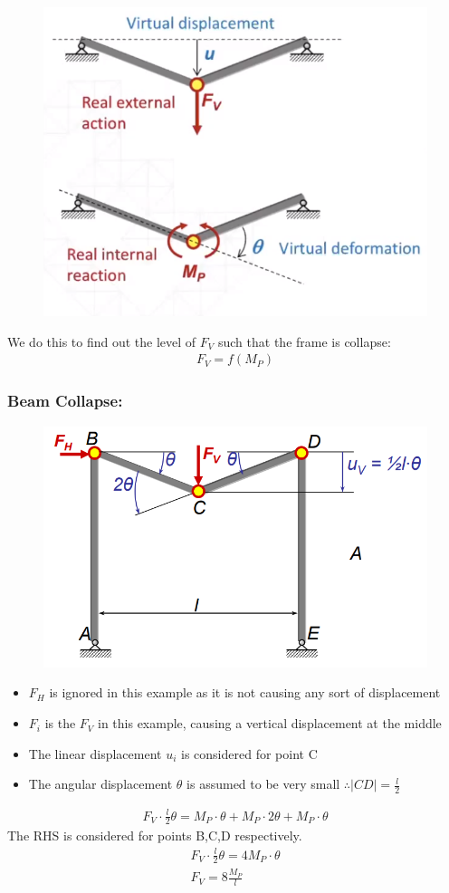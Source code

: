 \documentclass[class=report, crop=false, 12pt,a4paper]{standalone}
\begin{document}
\begin{figure}[H]
  \centering
  \includegraphics[width = 0.6 \textwidth]{../img/beam41.PNG}
\end{figure}
We do this to find out the level of $F_V$ such that the frame is collapse:
\begin{gather}
  F_V = f(M_P)
\end{gather}
\subsubsection{Beam Collapse:}
\begin{figure}[H]
  \centering
  \includegraphics[width = 0.65 \textwidth]{../img/beam42.PNG}
\end{figure}
\begin{itemize}
  \item $F_H$ is ignored in this example as it is not causing any sort of displacement
  \item $F_i$ is the $F_V$ in this example, causing a vertical displacement at the middle
  \item The linear displacement $u_i$ is considered for point C
  \item The angular displacement $\theta$ is assumed to be very small $\therefore |CD| = \frac{l}{2}$ 
\end{itemize}
\begin{gather}
  F_V\cdot\frac{l}{2}\theta = M_P\cdot\theta + M_P\cdot 2\theta + M_P \cdot\theta
\end{gather}
The RHS is considered for points B,C,D respectively.
\begin{gather}
  F_V\cdot\frac{l}{2}\theta = 4M_P\cdot\theta \\
  F_V = 8\frac{M_P}{l}
\end{gather}
\end{document}
